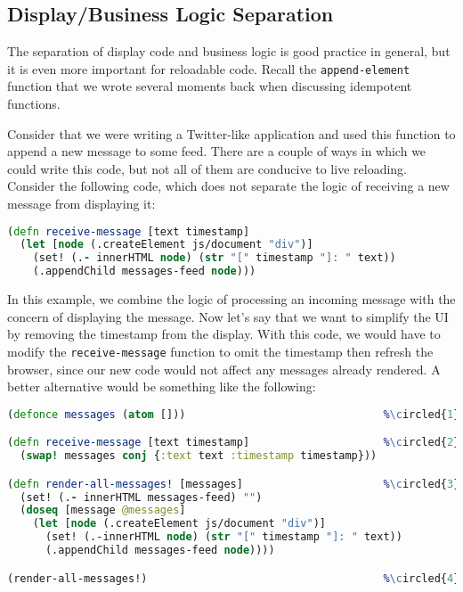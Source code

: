\documentclass[10pt,twoside,openright]{memoir}
\newcommand*\circled[1]{\tikz[baseline=(char.base)]{
            \node[shape=circle,draw,inner sep=1pt] (char) {#1};}}
\begin{document}
\subsection{Display/Business Logic Separation}

The separation of display code and business logic is good practice in
general, but it is even more important for reloadable code. Recall the
\texttt{append-element} function that we wrote several moments back when
discussing idempotent functions.

Consider that we were writing a Twitter-like application and used this
function to append a new message to some feed. There are a couple of
ways in which we could write this code, but not all of them are
conducive to live reloading. Consider the following code, which does not
separate the logic of receiving a new message from displaying it:

\begin{lstlisting}[language=Clojure, caption={Combining display and business logic}]
(defn receive-message [text timestamp]
  (let [node (.createElement js/document "div")]
    (set! (.- innerHTML node) (str "[" timestamp "]: " text))
    (.appendChild messages-feed node)))
\end{lstlisting}

In this example, we combine the logic of processing an incoming message
with the concern of displaying the message. Now let's say that we want
to simplify the UI by removing the timestamp from the display. With this
code, we would have to modify the \texttt{receive-message} function to
omit the timestamp then refresh the browser, since our new code would
not affect any messages already rendered. A better alternative would be
something like the following:

\begin{lstlisting}[language=Clojure, caption={Separating display and business logic}]
(defonce messages (atom []))                               %\circled{1}%

(defn receive-message [text timestamp]                     %\circled{2}%
  (swap! messages conj {:text text :timestamp timestamp}))

(defn render-all-messages! [messages]                      %\circled{3}%
  (set! (.- innerHTML messages-feed) "")
  (doseq [message @messages]
    (let [node (.createElement js/document "div")]
      (set! (.-innerHTML node) (str "[" timestamp "]: " text))
      (.appendChild messages-feed node))))

(render-all-messages!)                                     %\circled{4}%
\end{lstlisting}
\end{document}
